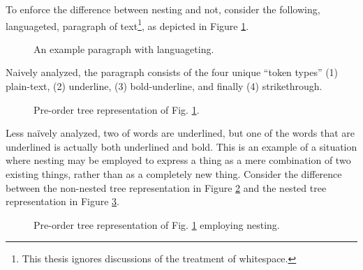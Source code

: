 \documentclass{scrreprt}
\begin{document}
To enforce the difference between nesting and not, consider the following, languageted, paragraph of text\footnote{This thesis ignores discussions of the treatment of whitespace.}, as depicted in Figure \ref{fig:mixed-content-paragraph}.


\begin{figure}[h]
\centering
{}
\caption{An example paragraph with languageting.}
\label{fig:mixed-content-paragraph}
\end{figure}


Naively analyzed, the paragraph consists of the four unique ``token types'' (1) plain-text, (2) underline, (3) bold-underline, and finally (4) strikethrough.





\begin{figure}[h]
  \centering

  \caption{Pre-order tree representation of Fig. \ref{fig:mixed-content-paragraph}.}
  \label{fig:mixed-content-flat-tree}
\end{figure}



Less naïvely analyzed, two of words are underlined, but one of the words that are underlined is actually both underlined and bold. This is an example of a situation where nesting may be employed to express a thing as a mere combination of two existing things, rather than as a completely new thing. Consider the difference between the non-nested tree representation in Figure \ref{fig:mixed-content-flat-tree} and the nested tree representation in Figure \ref{fig:mixed-content-tree}.


\begin{figure}[h]
  \centering

  \caption{Pre-order tree representation of Fig. \ref{fig:mixed-content-paragraph} employing nesting.}
  \label{fig:mixed-content-tree}
\end{figure}
\end{document}
